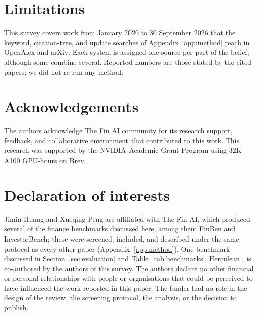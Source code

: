 \documentclass[11pt]{article}
\begin{document}
\section*{Limitations}
This survey covers work from January 2020 to 30 September 2026 that the keyword, citation-tree, and update searches of Appendix~\ref{app:method} reach in OpenAlex and arXiv. Each system is assigned one source per part of the belief, although some combine several. Reported numbers are those stated by the cited papers; we did not re-run any method.

\section*{Acknowledgements}
The authors acknowledge The Fin AI community for its research support, feedback, and collaborative environment that contributed to this work. This research was supported by the NVIDIA Academic Grant Program using 32K A100 GPU-hours on Brev.

\section*{Declaration of interests}
Jimin Huang and Xueqing Peng are affiliated with The Fin AI, which produced several of the finance benchmarks discussed here, among them FinBen and InvestorBench; these were screened, included, and described under the same protocol as every other paper (Appendix~\ref{app:method}). One benchmark discussed in Section~\ref{sec:evaluation} and Table~\ref{tab:benchmarks}, Herculean \citep{herculean2026}, is co-authored by the authors of this survey. The authors declare no other financial or personal relationships with people or organisations that could be perceived to have influenced the work reported in this paper. The funder had no role in the design of the review, the screening protocol, the analysis, or the decision to publish.



\appendix



\end{document}
